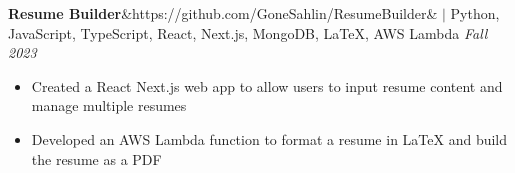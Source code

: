 \documentclass[11pt, a4paper, roman]{moderncv}
\newcommand{\project}[5]{
	\textbf{#1}\ifx&#2&{}
	\else
    		\href{#2}{\:\small\faGithub\:}\fi$|$ #3
	\hfill\textit{#4}
	#5
	\vspace{2mm}
}
\begin{document}

{\project{Resume Builder}{https://github.com/GoneSahlin/ResumeBuilder}{Python, JavaScript, TypeScript, React, Next.js, MongoDB, LaTeX, AWS Lambda}{Fall 2023}
	{\begin{itemize}
		\item Created a React Next.js web app to allow users to input resume content and manage multiple resumes
		\item Developed an AWS Lambda function to format a resume in LaTeX and build the resume as a PDF
	\end{itemize}}
}





\end{document}
